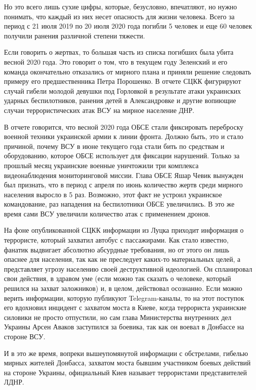 \documentclass[a4paper,11pt]{extreport}
\begin{document}
Но это всего лишь сухие цифры, которые, безусловно, впечатляют, но нужно
понимать, что каждый из них несет опасность для жизни человека. Всего за период
с 21 июля 2019 по 20 июля 2020 года погибли 5 человек и еще 60 человек получили
ранения различной степени тяжести.

Если говорить о жертвах, то большая часть из списка погибших была убита весной
2020 года. Это говорит о том, что в текущем году Зеленский и его команда
окончательно отказались от мирного плана и приняли решение следовать примеру
его предшественника Петра Порошенко. В отчете СЦКК фигурируют случай гибели
молодой девушки под Горловкой в результате атаки украинских ударных
беспилотников, ранения детей в Александровке и другие вопиющие случаи
террористических атак ВСУ на мирное население ДНР.

В отчете говорится, что весной 2020 года ОБСЕ стали фиксировать переброску
военной техники украинской армии к линии фронта. Должно быть, это и стало
причиной, почему ВСУ в июне текущего года стали бить по средствам и
оборудованию, которое ОБСЕ использует для фиксации нарушений. Только за прошлый
месяц украинские военные уничтожили три комплекса видеонаблюдения
мониторинговой миссии. Глава ОБСЕ Яшар Чевик вынужден был признать, что в
период с апреля по июнь количество жертв среди мирного населения выросло в 5
раз. Возможно, этот факт не устроил украинское командование, раз нападения на
беспилотники ОБСЕ увеличились. В это же время сами ВСУ увеличили количество
атак с применением дронов.

На фоне опубликованной СЦКК информации из Луцка приходит информация о
террористе, который захватил автобус с пассажирами. Как стало известно, фанатик
выдвигает абсолютно абсурдные требования, но от этого он лишь опаснее для
населения, так как не преследует каких-то материальных целей, а представляет
угрозу населению своей деструктивной идеологией. Он спланировал свои действия,
в здравом уме (если можно так сказать о человеке, который решился на захват
заложников) и, в целом, действовал осознанно. Если можно верить информации,
которую публикуют Telegram-каналы, то на этот поступок его вдохновил инцидент с
захватом моста в Киеве, когда террориста украинские силовики не просто
отпустили, но сам глава Министерства внутренних дел Украины Арсен Аваков
заступился за боевика, так как он воевал в Донбассе на стороне ВСУ.

И в это же время, вопреки вышеупомянутой информации с обстрелами, гибелью
мирных жителей Донбасса, захватом моста бывшим участником боевых действий на
стороне Украины, официальный Киев называет террористами представителей ЛДНР.
\end{document}
